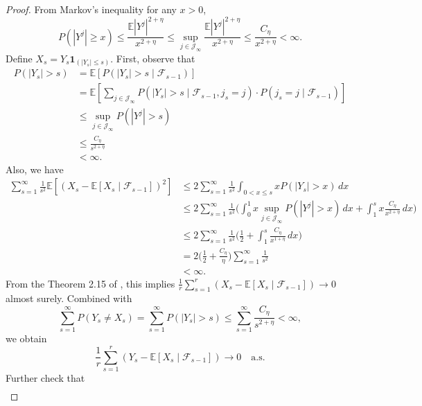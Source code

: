 \documentclass[12pt]{article}
\begin{document}
\begin{proof}
From Markov's inequality for any $x > 0$, 
\begin{equation*}
P( |Y^j| \ge x) \le \frac{\mathbb{E}|Y^j|^{2+\eta}}{x^{2 + \eta}} \le \sup_{j \in \mathcal{J}_{\infty}} \frac{\mathbb{E}|Y^j|^{2+\eta}}{x^{2 + \eta}} \le \frac{C_{\eta}}{x^{2+\eta}} < \infty.
\end{equation*}
Define $X_s = Y_s \mathbf{1}_{(|Y_s| \leq s)}$. First, observe that
\begin{align*}
P(|Y_s| > s) &= \mathbb{E}[ P(|Y_s| > s \mid \mathcal{F}_{s-1})]
\\ &= \mathbb{E}[ \sum_{j \in \mathcal{J}_{\infty}} P(|Y_s| > s \mid \mathcal{F}_{s-1}, j_s = j) \cdot P(j_s = j \mid \mathcal{F}_{s-1}) ]
\\ &\le \sup_{j \in \mathcal{J}_{\infty}} P( |Y^j| > s )
\\ &\le \frac{C_{\eta}}{s^{2+\eta}}
\\ &< \infty.
\end{align*}
Also, we have
\begin{align*}
\sum_{s=1}^{\infty} \frac{1}{s^2} \mathbb{E}[ (X_s - \mathbb{E}[X_s \mid \mathcal{F}_{s-1}])^2 ] 
&\le 2 \sum_{s=1}^{\infty} \frac{1}{s^2} \int_{0 < x \le s} x P(|Y_s| > x) \, dx
\\ &\le 2 \sum_{s=1}^{\infty} \frac{1}{s^2} \Big( \int_{0}^{1} x \sup_{j \in \mathcal{J}_{\infty}} P( |Y^j| > x) \, dx + \int_{1}^{s} x \frac{C_{\eta}}{x^{2+\eta}} \, dx  \Big)
\\ &\le 2 \sum_{s=1}^{\infty} \frac{1}{s^2} \Big( \frac{1}{2} + \int_{1}^{s} \frac{C_{\eta}}{x^{1+\eta}} \, dx \Big)
\\ &= 2 \Big( \frac{1}{2} + \frac{C_{\eta}}{\eta} \Big) \sum_{s=1}^{\infty} \frac{1}{s^2} 
\\ &< \infty.
\end{align*}
From the Theorem 2.15 of , this implies $\frac{1}{r} \sum_{s=1}^{r} ( X_s - \mathbb{E}[X_s \mid \mathcal{F}_{s-1}]) \to 0$ almost surely. Combined with 
\begin{equation*}
\sum_{s=1}^{\infty} P( Y_s \neq X_s ) = \sum_{s=1}^{\infty} P( |Y_s| > s ) \le \sum_{s=1}^{\infty} \frac{C_{\eta}}{s^{2+\eta}} < \infty,
\end{equation*}
we obtain 
\begin{equation*}
\frac{1}{r} \sum_{s=1}^{r} (Y_s - \mathbb{E}[X_s \mid \mathcal{F}_{s-1}]) \to 0 \quad \text{a.s}.
\end{equation*}
Further check that 
\begin{align*}

\end{align*}
\end{proof}
\end{document}

